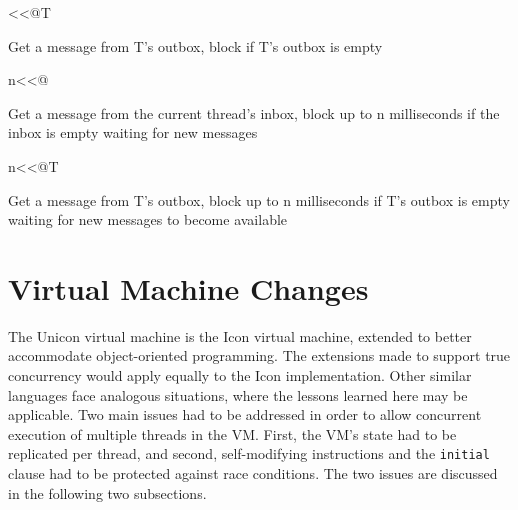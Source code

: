 <<@T

Get a message from T's outbox, block if T's outbox is empty

n<<@

Get a message from the current thread's inbox, block up to n milliseconds if
the inbox is empty waiting for new messages

n<<@T

Get a message from T's outbox, block up to n milliseconds if T's outbox is empty
waiting for new messages to become available


\section{Virtual Machine Changes}
The Unicon virtual machine is the Icon virtual machine, extended to better
accommodate object-oriented programming. The extensions made to support
true concurrency would apply equally to the Icon implementation. Other
similar languages face analogous situations, where the lessons learned here
may be applicable. Two main issues had to be addressed in order to allow
concurrent execution of multiple threads in the VM. First, the VM's state
had to be replicated per thread, and second, self-modifying instructions
and the \texttt{initial} clause had to be protected against race
conditions. The two issues are discussed in the following two subsections.


